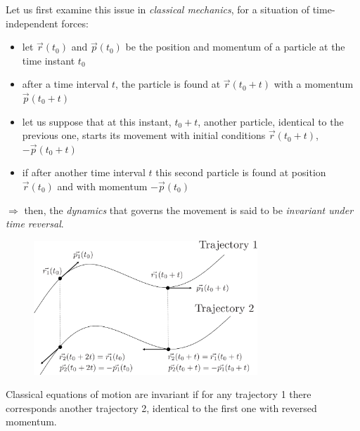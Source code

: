 \documentclass[12pt]{article}
\begin{document}
Let us first examine this issue in \emph{classical
mechanics}, for a situation of time-independent
forces:
\begin{itemize}
\item let $\vec{r}\left(t_{0}\right)$ and $\vec{p}\left(t_{0}\right)$ be the position and
momentum of a particle at the time instant $t_0$
\item after a time interval $t$, the particle is found
at $\vec{r}\left(t_{0}+t\right)$ with a momentum $\vec{p}\left(t_{0}+t\right)$
\item let us suppose that at this instant, $t_0+t$,
another particle, identical to the previous one,
starts its movement with initial conditions
$\vec{r}\left(t_{0}+t\right)$, $-\vec{p}\left(t_{0}+t\right)$
%
\item if after another time interval $t$ this second
particle is found at position $\vec{r}\left(t_{0}\right)$ and
with momentum $-\vec{p}\left(t_{0}\right)$
\end{itemize}
$\Rightarrow$ then, the \emph{dynamics} that governs
the movement is said to be
\emph{invariant under time reversal}.

\begin{figure}[htbp]
\centering
\includegraphics[width=0.75\textwidth]{Figures/TimeReversal1-crop.pdf}
\end{figure}

Classical equations of motion are invariant if for
any trajectory 1 there corresponds another
trajectory 2, identical to the first one with
reversed momentum.
\end{document}
